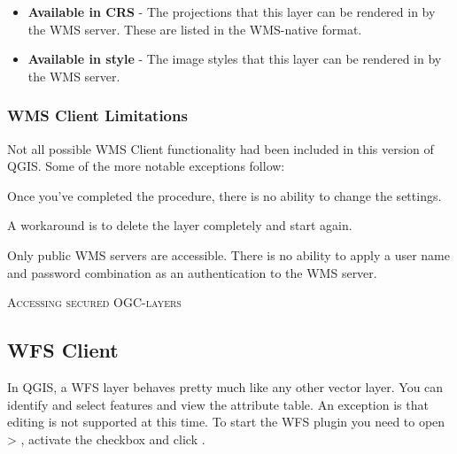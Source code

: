 \begin{itemize}
\begin{itemize}
\item \textbf{Available in CRS} - The projections that this layer can be rendered in by
                                  the WMS server.  These are listed in the WMS-native format.

\item \textbf{Available in style} - The image styles that this layer can be rendered in by
                                    the WMS server.

\end{itemize}

\end{itemize}


\subsubsection{WMS Client Limitations}\label{sec:ogc-wms-limits}

Not all possible WMS Client functionality had been included in this version of QGIS.
Some of the more notable exceptions follow:


Once you've completed the 
procedure, there is no ability to change the settings.

A workaround is to delete the layer completely and start again.


Only public WMS servers are accessible.
There is no ability to apply a user name and password combination
as an authentication to the WMS server.

\begin{Tip}[ht]\caption{\textsc{Accessing secured OGC-layers}}
\end{Tip}


\subsection{WFS Client}

In QGIS, a WFS layer behaves pretty much like any other vector layer. You 
can identify and select features and view the attribute table. An exception 
is that editing is not supported at this time. To start the WFS plugin you 
need to open  > , 
activate the  checkbox and click . 

